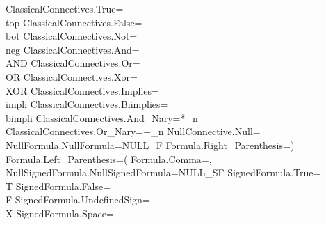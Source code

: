 ClassicalConnectives.True=\\top 
ClassicalConnectives.False=\\bot 
ClassicalConnectives.Not=\\neg 
ClassicalConnectives.And=\\AND 
ClassicalConnectives.Or=\\OR 
ClassicalConnectives.Xor=\\XOR
ClassicalConnectives.Implies=\\impli 
ClassicalConnectives.Biimplies=\\bimpli 
ClassicalConnectives.And_Nary=*_n
ClassicalConnectives.Or_Nary=+_n
NullConnective.Null=
NullFormula.NullFormula=NULL_F
Formula.Right_Parenthesis=)
Formula.Left_Parenthesis=(
Formula.Comma=,
NullSignedFormula.NullSignedFormula=NULL_SF
SignedFormula.True=\\T 
SignedFormula.False=\\F 
SignedFormula.UndefinedSign=\\X 
SignedFormula.Space=\ 
